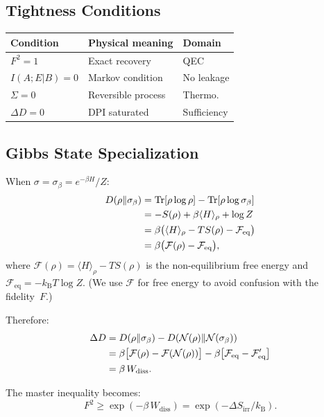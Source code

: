 \documentclass[prl,twocolumn,superscriptaddress,longbibliography]{revtex4-2}
\newcommand{\kB}{k_{\mathrm{B}}}
\newcommand{\Tr}{\mathrm{Tr}}
\newcommand{\chan}{\mathcal{N}}
\begin{document}
\subsection{Tightness Conditions}

\begin{center}
\begin{tabular}{lll}
\toprule
\textbf{Condition} & \textbf{Physical meaning} & \textbf{Domain} \\
\midrule
$F^2 = 1$ & Exact recovery & QEC \\
$I(A;E|B) = 0$ & Markov condition & No leakage \\
$\Sigma = 0$ & Reversible process & Thermo. \\
$\Delta D = 0$ & DPI saturated & Sufficiency \\
\bottomrule
\end{tabular}
\end{center}

\subsection{Gibbs State Specialization}

When $\sigma = \sigma_\beta = e^{-\beta H}/Z$:
\begin{align}
D(\rho\|\sigma_\beta) &= \Tr[\rho \log \rho] - \Tr[\rho \log
\sigma_\beta] \notag\\
&= -S(\rho) + \beta\langle H\rangle_\rho + \log Z \notag\\
&= \beta\big(\langle H\rangle_\rho - T S(\rho) - \mathcal{F}_{\mathrm{eq}}\big)
\notag\\
&= \beta\big(\mathcal{F}(\rho) - \mathcal{F}_{\mathrm{eq}}\big),
\end{align}
where $\mathcal{F}(\rho) = \langle H\rangle_\rho - T S(\rho)$ is the
non-equilibrium free energy and $\mathcal{F}_{\mathrm{eq}} = -\kB T \log Z$.
(We use $\mathcal{F}$ for free energy to avoid confusion with the
fidelity~$F$.)

Therefore:
\begin{align}
\Delta D &= D(\rho\|\sigma_\beta) - D(\chan(\rho)\|\chan(\sigma_\beta))
\notag\\
&= \beta\big[\mathcal{F}(\rho) - \mathcal{F}(\chan(\rho))\big]
  - \beta\big[\mathcal{F}_{\mathrm{eq}} - \mathcal{F}'_{\mathrm{eq}}\big] \notag\\
&= \beta\, W_{\mathrm{diss}}.
\end{align}

The master inequality becomes:
\begin{equation}
\boxed{
F^2 \geq \exp(-\beta\, W_{\mathrm{diss}})
= \exp(-\Delta S_{\mathrm{irr}}/\kB).
}
\end{equation}
\end{document}
